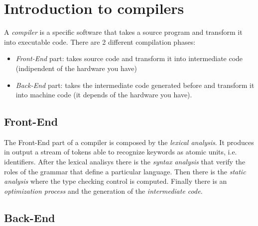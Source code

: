 \chapter{Introduction to compilers}

A \textit{compiler} is a specific software that takes a source program and transform it into executable code. There are 2 different compilation phases:
\begin{itemize}
\item \textit{Front-End} part: takes source code and transform it into intermediate code (indipendent of the hardware you have)
\item \textit{Back-End} part: takes the intermediate code generated before and transform it into machine code (it depends of the hardware you have).
\end{itemize}

\section{Front-End}

The Front-End part of a compiler is composed by the \textit{lexical analysis}. It produces in output a stream of tokens able to recognize keywords as atomic units, i.e. identifiers.
After the lexical analisys there is the \textit{syntax analysis} that verify the roles of the grammar that define a particular language.
Then there is the \textit{static analysis} where the type checking control is computed. Finally there is an \textit{optimization process} and the generation of the \textit{intermediate code}.







\section{Back-End}

